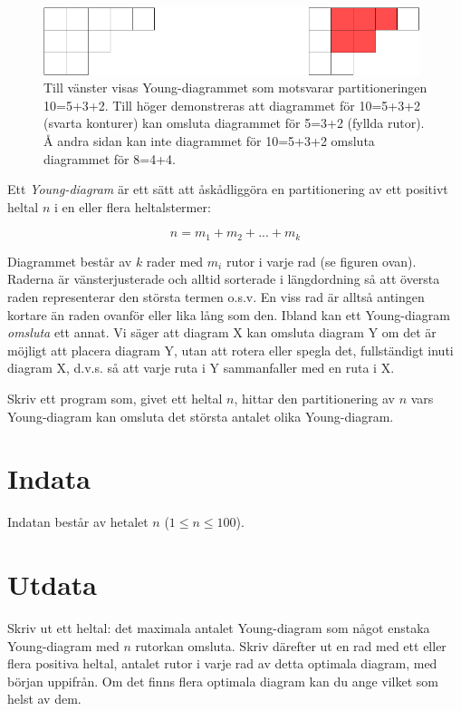 
\begin{figure}[!h]
\includegraphics[width=0.98\textwidth]{young}
\caption{Till vänster visas Young-diagrammet som motsvarar partitioneringen 10=5+3+2. Till höger demonstreras att diagrammet för 10=5+3+2 (svarta konturer) kan omsluta diagrammet för 5=3+2 (fyllda rutor). Å andra sidan kan inte diagrammet för 10=5+3+2 omsluta diagrammet för 8=4+4.}
\end{figure}

Ett \emph{Young-diagram} är ett sätt att åskådliggöra en partitionering av ett positivt heltal $n$ i en eller flera heltalstermer:

$$n = m_1 + m_2 + ... + m_k$$

Diagrammet består av $k$ rader med $m_i$ rutor i varje rad (se figuren ovan). Raderna är vänsterjusterade och alltid sorterade i längdordning så att översta raden representerar den största termen o.s.v. En viss rad är alltså antingen kortare än raden ovanför eller lika lång som den. Ibland kan ett Young-diagram \emph{omsluta} ett annat. Vi säger att diagram X kan omsluta diagram Y om det är möjligt att placera diagram Y, utan att rotera eller spegla det, fullständigt inuti diagram X, d.v.s. så att varje ruta i Y sammanfaller med en ruta i X.

Skriv ett program som, givet ett heltal $n$, hittar den partitionering av $n$ vars Young-diagram kan omsluta det största antalet olika Young-diagram.

\section*{Indata}
Indatan består av hetalet $n$ ($1 \le n \le 100$).

\section*{Utdata}
Skriv ut ett heltal: det maximala antalet Young-diagram som något enstaka Young-diagram med $n$ rutorkan omsluta.
Skriv därefter ut en rad med ett eller flera positiva heltal, antalet rutor i varje rad av detta optimala diagram,
med början uppifrån. Om det finns flera optimala diagram kan du ange vilket som helst av dem.

